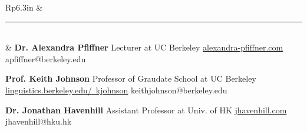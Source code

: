 \documentclass[letterpaper, 11pt]{article}
\newcommand{\headingfont}{\Large\color{black}}
\newenvironment{SectionTable}[1]{
	\renewcommand*{\arraystretch}{1.3}
	\setlength{\tabcolsep}{10pt}
	\begin{longtable}{Rp{6.3in}} & #1 \vspace{0.13cm}\hrule\\[0.6em]}
{\end{longtable}\vspace{-.3cm}}
\newenvironment{SectionTableSingleSpace}[1]{
	\renewcommand*{\arraystretch}{1.3}
	\setlength{\tabcolsep}{10pt}
	\begin{longtable}{Rp{6.3in}} & #1 \vspace{0.13cm}\hrule \\[0.6em] }
{\end{longtable}\vspace{-.3cm}}
\begin{document}
\begin{SectionTableSingleSpace}{\headingfont{References}}
	&
		\textbf{Dr. Alexandra Pfiffner}\newline
		Lecturer at UC Berkeley\newline
		\href{https://www.alexandra-pfiffner.com/}{alexandra-pfiffner.com}\newline
		apfiffner@berkeley.edu\newline

		\textbf{Prof. Keith Johnson}\newline
		Professor of Graudate School at UC Berkeley\newline
		\href{https://linguistics.berkeley.edu/~kjohnson/}{linguistics.berkeley.edu/~kjohnson}\newline
		keithjohnson@berkeley.edu\newline

		\textbf{Dr. Jonathan Havenhill}\newline
		Assistant Professor at Univ. of HK\newline
		\href{https://jhavenhill.com}{jhavenhill.com}\newline
		jhavenhill@hku.hk
\end{SectionTableSingleSpace}


\mbox{}
\end{document}
